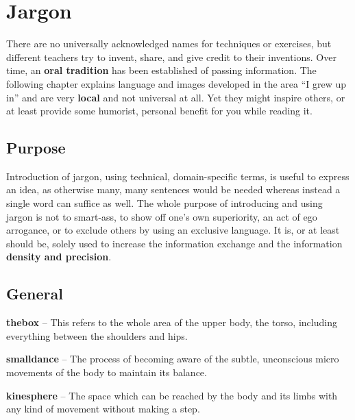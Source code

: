 \section{Jargon}\label{sec:jargon}


There are no universally acknowledged names for techniques or exercises, but different teachers try to invent, share, and give credit to their inventions.
Over time, an \textbf{oral tradition} has been established of passing information.
The following chapter explains language and images developed in the area ``I grew up in'' and are very \textbf{local} and not universal at all.
Yet they might inspire others, or at least provide some humorist, personal benefit for you while reading it.

\subsection{Purpose}\label{subsec:purpose}

Introduction of jargon, using technical, domain-specific terms, is useful to express an idea, as otherwise many, many sentences would be needed whereas instead a single word can suffice as well.
The whole purpose of introducing and using jargon is not to smart-ass, to show off one's own superiority, an act of ego arrogance, or to exclude others by using an exclusive language.
It is, or at least should be, solely used to increase the information exchange and the information \textbf{density and precision}.

\subsection{General}\label{subsec:general}

\noindent \textbf{\Gls{thebox}} -- This refers to the whole area of the upper body, the torso, including everything between the shoulders and hips.

\noindent \textbf{\Gls{smalldance}} -- The process of becoming aware of the subtle, unconscious micro movements of the body to maintain its balance.

\noindent \textbf{\Gls{kinesphere}} -- The space which can be reached by the body and its limbs with any kind of movement without making a step.

